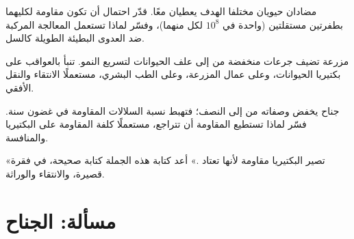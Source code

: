 \begin{exercise}[$\star\star\star$]\label{exo:g11:antibiotic-resistance:12}
مضادان حيويان مختلفا الهدف يعطيان معًا. قدّر احتمال أن تكون  مقاومة
لكليهما بطفرتين مستقلتين (واحدة في $10^8$ لكل منهما)، وفسّر لماذا
تستعمل المعالجة المركبة ضد العدوى البطيئة الطويلة كالسل.
\end{exercise}

\begin{exercise}[$\star\star\star$]\label{exo:g11:antibiotic-resistance:13}
مزرعة تضيف جرعات منخفضة من  إلى علف الحيوانات لتسريع النمو.
تنبأ بالعواقب على بكتيريا الحيوانات، وعلى عمال المزرعة، وعلى الطب
البشري، مستعملًا الانتقاء والنقل الأفقي.
\end{exercise}

\begin{exercise}[$\star\star\star$]\label{exo:g11:antibiotic-resistance:14}
جناح يخفض وصفاته من  إلى النصف؛ فتهبط نسبة السلالات
المقاومة في غضون سنة. فسّر لماذا تستطيع المقاومة أن تتراجع، مستعملًا
كلفة المقاومة على البكتيريا والمنافسة.
\end{exercise}

\begin{exercise}[$\star\star\star$]\label{exo:g11:antibiotic-resistance:15}
«تصير البكتيريا مقاومة لأنها تعتاد .» أعد كتابة هذه
الجملة كتابة صحيحة، في فقرة قصيرة،  والانتقاء والوراثة.
\end{exercise}

\section{مسألة: الجناح}

